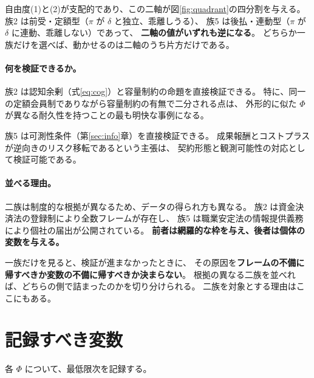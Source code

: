 自由度(1)と(2)が支配的であり、この二軸が図\ref{fig:quadrant}の四分割を与える。
族2 は前受・定額型（$\pi$ が $\delta$ と独立、乖離しうる）、
族5 は後払・連動型（$\pi$ が $\delta$ に連動、乖離しない）であって、
\textbf{二軸の値がいずれも逆になる}。
どちらか一族だけを選べば、動かせるのは二軸のうち片方だけである。

\paragraph{何を検証できるか。}

族2 は認知余剰（式\eqref{eq:cog}）と容量制約の命題を直接検証できる。
特に、同一の定額会員制でありながら容量制約の有無で二分される点は、
外形的に似た $\Phi$ が異なる耐久性を持つことの最も明快な事例になる。

族5 は可測性条件（第\ref{sec:info}章）を直接検証できる。
成果報酬とコストプラスが逆向きのリスク移転であるという主張は、
契約形態と観測可能性の対応として検証可能である。

\paragraph{並べる理由。}

二族は制度的な根拠が異なるため、データの得られ方も異なる。
族2 は資金決済法の登録制により全数フレームが存在し、
族5 は職業安定法の情報提供義務により個社の届出が公開されている。
\textbf{前者は網羅的な枠を与え、後者は個体の変数を与える。}

一族だけを見ると、検証が進まなかったときに、
その原因を\textbf{フレームの不備に帰すべきか変数の不備に帰すべきか決まらない}。
根拠の異なる二族を並べれば、どちらの側で詰まったのかを切り分けられる。
二族を対象とする理由はここにもある。

\section{記録すべき変数}

各 $\Phi$ について、最低限次を記録する。

